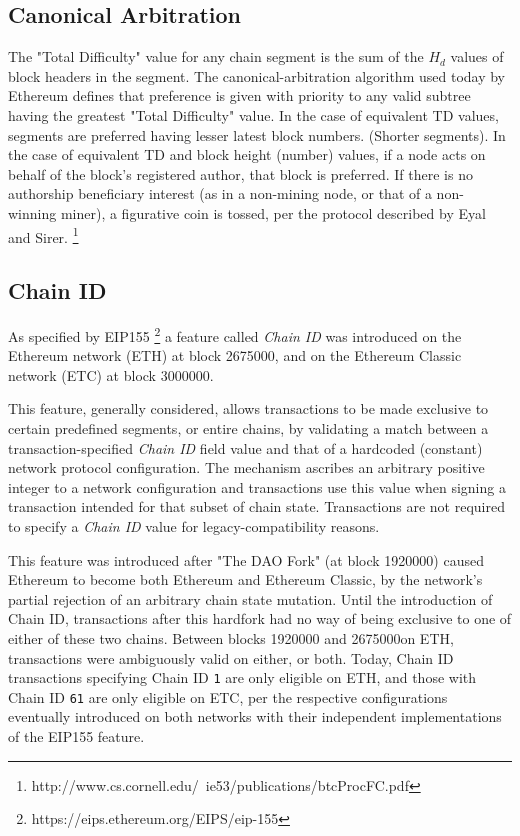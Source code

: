 \documentclass[11pt]{article}
\theoremstyle{plain}
\begin{document}
\subsection{\small{Canonical Arbitration}}\label{sec: S1.3}

The "Total Difficulty" value for any chain segment is the sum of the $H_d$ 
values of block headers in the segment.
The canonical-arbitration algorithm used today by Ethereum defines %
that preference is given with priority to any valid subtree having the greatest 
"Total Difficulty" value.
In the case of equivalent TD values, segments are preferred having lesser 
latest block numbers. (Shorter segments).
In the case of equivalent TD and block height (number) values, if a node acts 
on behalf of the block's registered author, that block is preferred.
If there is no authorship beneficiary interest (as in a non-mining node, or 
that of a non-winning miner), a figurative coin is tossed, per the protocol 
described by Eyal and Sirer.\nolinebreak
\footnote{http://www.cs.cornell.edu/~ie53/publications/btcProcFC.pdf}

\subsection{\small{Chain ID}}\label{sec: S1.4}

As specified by EIP155\nolinebreak
\footnote{https://eips.ethereum.org/EIPS/eip-155} a feature called
\textit{Chain ID} was introduced on the Ethereum network (ETH) at block
2675000, and on the Ethereum Classic network (ETC) at block 3000000.

This feature, generally considered, allows transactions to be made exclusive to
certain predefined segments, or entire chains, by validating a match between a
transaction-specified \textit{Chain ID} field value and that of a hardcoded
(constant) network protocol configuration.
The mechanism ascribes an arbitrary positive integer to a network configuration
and transactions use this value when signing a transaction intended for that
subset of chain state.
Transactions are not required to specify a \textit{Chain ID} value for
legacy-compatibility reasons.

This feature was introduced after "The DAO Fork" (at block 1920000) caused
Ethereum to become both Ethereum and Ethereum Classic, by the network's partial
rejection of an arbitrary chain state mutation.
Until the introduction of Chain ID, transactions after this hardfork had no way
of being exclusive to one of either of these two chains. Between blocks 1920000
and 2675000on ETH, transactions were ambiguously valid on either, or both.
Today, Chain ID transactions specifying Chain ID \texttt{1} are only eligible
on ETH, and those with Chain ID \texttt{61} are only eligible on ETC, per the
respective configurations eventually introduced on both networks with their
independent implementations of the EIP155 feature.
\end{document}
